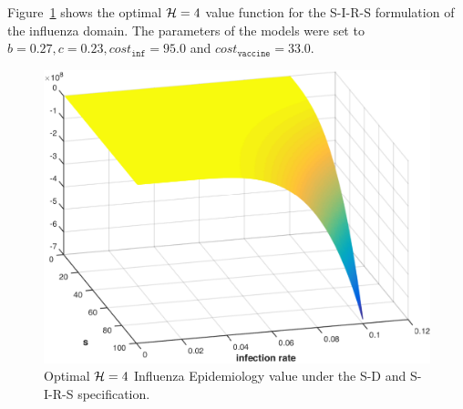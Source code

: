 Figure~\ref{fig:influenza_sirs} shows the optimal {\footnotesize$ \mathcal{H} = 4 $} value function for the S-I-R-S formulation of the influenza domain. The parameters of the models were set to $b = 0.27, c = 0.23, cost_{\mathtt{inf}} = 95.0$ and $cost_{\mathtt{vaccine}} = 33.0$.

\begin{figure}[t!]
    \includegraphics[width=\linewidth, height=0.8\linewidth]{images/sir_infection_s}
    \caption{Optimal $ \mathcal{H} = 4 $ Influenza Epidemiology value under the S-D and S-I-R-S specification.}
    \label{fig:influenza_sirs}
\end{figure}

